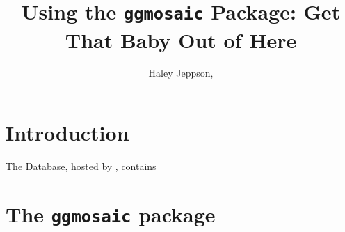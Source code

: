 \documentclass[DIV=calc, paper=a4, fontsize=10pt, twocolumn]{scrartcl}	 %
\title{Using the \texttt{ggmosaic} Package: Get That Baby Out of Here} %
\author{Haley Jeppson, } %
\date{} %
\newcommand{\initial}[1]{ %
\lettrine[lines=3,lhang=0.3,nindent=0em]{
\color{black}
{\textsf{#1}}}{}}
\newcommand{\st}[1]{{\color{purple} #1}}
\begin{document}


\maketitle %

\thispagestyle{fancy} %


\vspace{-1cm}

\section*{Introduction}

\par The  Database, hosted by , contains

\section*{The \texttt{ggmosaic} package}
\end{document}
